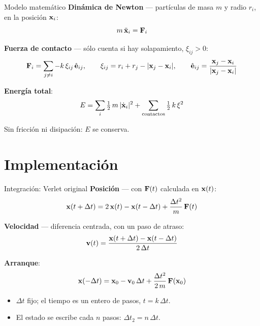 \begin{frame}{Modelo matemático}
  \small
  \abovedisplayskip=3pt \belowdisplayskip=3pt
  \abovedisplayshortskip=0pt \belowdisplayshortskip=2pt
  \textbf{Dinámica de Newton} --- partículas de masa $m$ y radio $r_i$, en la posición $\mathbf{x}_i$:
  \[
    m\,\ddot{\mathbf{x}}_i = \mathbf{F}_i
  \]

  \textbf{Fuerza de contacto} --- sólo cuenta si hay solapamiento, $\xi_{ij} > 0$:
  \[
    \mathbf{F}_i = \sum_{j \neq i} -k\,\xi_{ij}\,\hat{\mathbf{e}}_{ij},
    \qquad
    \xi_{ij} = r_i + r_j - |\mathbf{x}_j - \mathbf{x}_i|,
    \qquad
    \hat{\mathbf{e}}_{ij} = \frac{\mathbf{x}_j - \mathbf{x}_i}{|\mathbf{x}_j - \mathbf{x}_i|}
  \]

  \textbf{Energía total}:
  \[
    E = \sum_i \tfrac{1}{2}\,m\,|\dot{\mathbf{x}}_i|^2 + \sum_{\text{contactos}} \tfrac{1}{2}\,k\,\xi^2
  \]

  \centering
  Sin fricción ni disipación: $E$ se conserva.
\end{frame}

\section{Implementación}

\begin{frame}{Integración: Verlet original}
  \small
  \abovedisplayskip=3pt \belowdisplayskip=3pt
  \abovedisplayshortskip=0pt \belowdisplayshortskip=2pt
  \textbf{Posición} --- con $\mathbf{F}(t)$ calculada en $\mathbf{x}(t)$:
  \[
    \mathbf{x}(t + \Delta t) = 2\,\mathbf{x}(t) - \mathbf{x}(t - \Delta t) + \frac{\Delta t^2}{m}\,\mathbf{F}(t)
  \]

  \textbf{Velocidad} --- diferencia centrada, con un paso de atraso:
  \[
    \mathbf{v}(t) = \frac{\mathbf{x}(t + \Delta t) - \mathbf{x}(t - \Delta t)}{2\,\Delta t}
  \]

  \textbf{Arranque}:
  \[
    \mathbf{x}(-\Delta t) = \mathbf{x}_0 - \mathbf{v}_0\,\Delta t + \frac{\Delta t^2}{2\,m}\,\mathbf{F}(\mathbf{x}_0)
  \]

  \begin{itemize}
    \item $\Delta t$ fijo; el tiempo es un entero de pasos, $t = k\,\Delta t$.
    \item El estado se escribe cada $n$ pasos: $\Delta t_2 = n\,\Delta t$.
  \end{itemize}
\end{frame}

